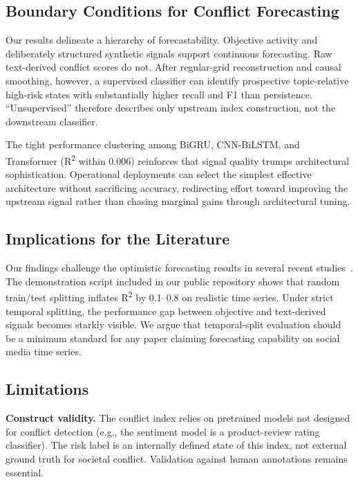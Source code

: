 \documentclass[11pt,a4paper]{article}
\begin{document}
\subsection{Boundary Conditions for Conflict Forecasting}

Our results delineate a hierarchy of forecastability. Objective activity and deliberately structured synthetic signals support continuous forecasting. Raw text-derived conflict scores do not. After regular-grid reconstruction and causal smoothing, however, a supervised classifier can identify prospective topic-relative high-risk states with substantially higher recall and F1 than persistence. ``Unsupervised'' therefore describes only upstream index construction, not the downstream classifier.

The tight performance clustering among BiGRU, CNN-BiLSTM, and Transformer (R\textsuperscript{2} within 0.006) reinforces that signal quality trumps architectural sophistication. Operational deployments can select the simplest effective architecture without sacrificing accuracy, redirecting effort toward improving the upstream signal rather than chasing marginal gains through architectural tuning.

\subsection{Implications for the Literature}

Our findings challenge the optimistic forecasting results in several recent studies~\cite{Mu2023IPSO,Zhang2024TRESP,lou2024cnnlstm}. The demonstration script included in our public repository shows that random train/test splitting inflates R\textsuperscript{2} by 0.1--0.8 on realistic time series. Under strict temporal splitting, the performance gap between objective and text-derived signals becomes starkly visible. We argue that temporal-split evaluation should be a minimum standard for any paper claiming forecasting capability on social media time series.

\subsection{Limitations}

\textbf{Construct validity.} The conflict index relies on pretrained models not designed for conflict detection (e.g., the sentiment model is a product-review rating classifier). The risk label is an internally defined state of this index, not external ground truth for societal conflict. Validation against human annotations remains essential.
\end{document}
